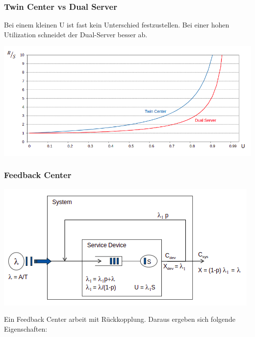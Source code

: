 \subsubsection{Twin Center vs Dual Server}

Bei einem kleinen U ist fast kein Unterschied festzustellen. Bei einer hohen Utilization schneidet der Dual-Server besser ab.


\begin{minipage}[t]{0.9\textwidth}
\centering
\includegraphics[width=0.9\linewidth]{images/twin-center_vs_dual-server.png}
\end{minipage}

\subsubsection{Feedback Center}

\begin{minipage}[t]{0.9\textwidth}
\centering
\includegraphics[width=0.9\linewidth]{images/feedback_center.png}
\end{minipage}

Ein Feedback Center arbeit mit Rückkopplung. Daraus ergeben sich folgende Eigenschaften:
\newline

